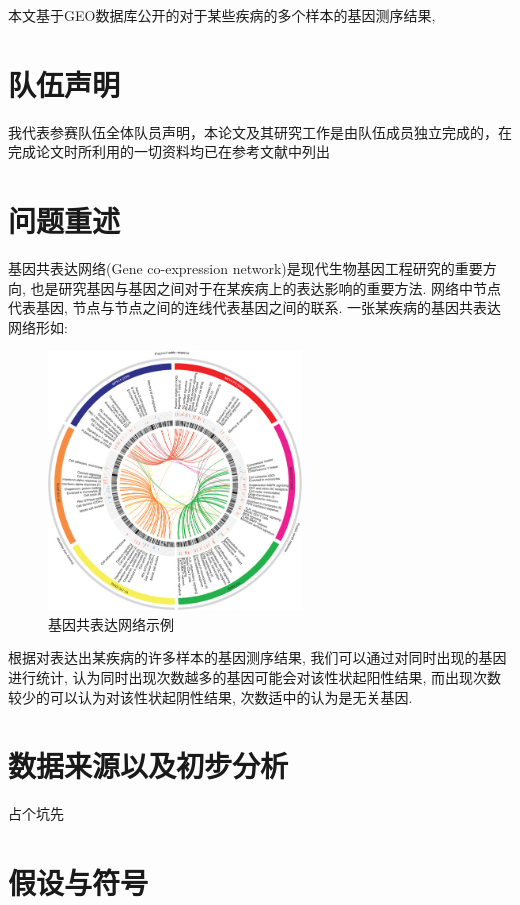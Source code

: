 \documentclass[zihao=-4]{ctexart}
\begin{document}
本文基于GEO数据库公开的对于某些疾病的多个样本的基因测序结果, 


\newpage

\section*{队伍声明}

我代表参赛队伍全体队员声明，本论文及其研究工作是由队伍成员独立完成的，在完成论文时所利用的一切资料均已在参考文献中列出 
\newpage
\tableofcontents

\section{问题重述}
基因共表达网络(Gene co-expression network)是现代生物基因工程研究的重要方向, 也是研究基因与基因之间对于在某疾病上的表达影响的重要方法. 网络中节点代表基因, 节点与节点之间的连线代表基因之间的联系. 一张某疾病的基因共表达网络形如:
\begin{figure}[H]
    \centering
    \includegraphics[width=0.6\textwidth]{pic/example.jpg}
    \caption{基因共表达网络示例\cite{example}}
\end{figure}

根据对表达出某疾病的许多样本的基因测序结果, 我们可以通过对同时出现的基因进行统计, 认为同时出现次数越多的基因可能会对该性状起阳性结果, 而出现次数较少的可以认为对该性状起阴性结果, 次数适中的认为是无关基因.

\section{数据来源以及初步分析}
占个坑先

\section{假设与符号}
\end{document}
